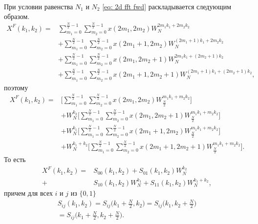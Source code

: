 При условии равенства $N_1$ и $N_2$ \eqref{eq: 2d fft fwd} раскладывается следующим образом.
\begin{equation*}\begin{aligned}
X^F(k_1, k_2)
 =& \sum_{m_1=0}^{\frac{N}{2}-1}\sum_{m_2=0}^{\frac{N}{2}-1} x(2 m_1, 2 m_2) W_N^{2 m_1 k_1 + 2 m_2 k_2} \\
 &+ \sum_{m_1=0}^{\frac{N}{2}-1}\sum_{m_2=0}^{\frac{N}{2}-1} x(2 m_1 + 1, 2 m_2) W_N^{(2 m_1 + 1) k_1 + 2 m_2 k_2} \\
 &+ \sum_{m_1=0}^{\frac{N}{2}-1}\sum_{m_2=0}^{\frac{N}{2}-1} x(2 m_1, 2 m_2 + 1) W_N^{2 m_1 k_1 + (2 m_2 + 1) k_2} \\
 &+ \sum_{m_1=0}^{\frac{N}{2}-1}\sum_{m_2=0}^{\frac{N}{2}-1} x(2 m_1 + 1, 2 m_2 + 1) W_N^{(2 m_1 + 1) k_1 + (2 m_2 + 1) k_2},
\end{aligned}\end{equation*}
поэтому
\begin{equation}\label{eq: binary fft decomposition}\begin{aligned}
X^F(k_1, k_2)
 =& \Big[\sum_{m_1=0}^{\frac{N}{2}-1}\sum_{m_2=0}^{\frac{N}{2}-1} x(2 m_1, 2 m_2) W_{\frac{N}{2}}^{m_1 k_1 + m_2 k_2}\Big] \\
 &+ W_N^{k_2}\Big[\sum_{m_1=0}^{\frac{N}{2}-1}\sum_{m_2=0}^{\frac{N}{2}-1} x(2 m_1, 2 m_2 + 1) W_{\frac{N}{2}}^{m_1 k_1 + m_2 k_2}\Big] \\
 &+ W_N^{k_1}\Big[\sum_{m_1=0}^{\frac{N}{2}-1}\sum_{m_2=0}^{\frac{N}{2}-1} x(2 m_1 + 1, 2 m_2) W_{\frac{N}{2}}^{m_1 k_1 + m_2 k_2}\Big] \\
 &+ W_N^{k_1+k_2}\Big[\sum_{m_1=0}^{\frac{N}{2}-1}\sum_{m_2=0}^{\frac{N}{2}-1} x(2 m_1 + 1, 2 m_2 + 1) W_{\frac{N}{2}}^{m_1 k_1 + m_2 k_2}\Big].
\end{aligned}\end{equation}
То есть
\begin{equation}\label{eq:fft_recursion}\begin{aligned}
X^F(k_1, k_2) =& S_{00}(k_1,k_2) + S_{01}(k_1, k_2) W_N^{k_2} \\
              +& S_{10}(k_1, k_2) W_N^{k_1} + S_{11}(k_1, k_2) W_N^{k_1 + k_2},
\end{aligned}\end{equation}
причем для всех $i$ и $j$ из $\{0, 1\}$
\begin{equation}\label{eq: fft_recursion_components}\begin{gathered}
S_{i j}(k_1, k_2) = S_{i j}\Big(k_1 + \frac{N}{2}, k_2\Big) = S_{i j}\Big(k_1, k_2 + \frac{N}{2}\Big) \\
= S_{i j}\Big(k_1 + \frac{N}{2}, k_2 + \frac{N}{2}\Big).
\end{gathered}\end{equation}

